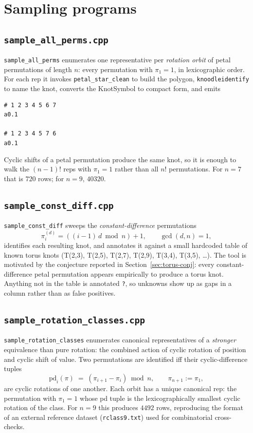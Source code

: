 \documentclass[11pt,oneside]{report}
\theoremstyle{definition}
\newcommand{\pd}{\mathrm{pd}}
\begin{document}
\section{Sampling programs}\label{sec:sampling}

\subsection{\texttt{sample\_all\_perms.cpp}}

\texttt{sample\_all\_perms} enumerates one representative per \emph{rotation
orbit} of petal permutations of length $n$: every permutation with
$\pi_1 = 1$, in lexicographic order. For each rep it invokes
\texttt{petal\_star\_clean} to build the polygon, \texttt{knoodleidentify}
to name the knot, converts the KnotSymbol to compact form, and emits

\begin{lstlisting}[style=shell]
# 1 2 3 4 5 6 7
a0.1

# 1 2 3 4 5 7 6
a0.1
\end{lstlisting}

Cyclic shifts of a petal permutation produce the same knot, so it is
enough to walk the $(n-1)!$ reps with $\pi_1 = 1$ rather than all $n!$
permutations. For $n = 7$ that is $720$ rows; for $n = 9$, $40320$.

\subsection{\texttt{sample\_const\_diff.cpp}}\label{sec:sampleconstdiff}

\texttt{sample\_const\_diff} sweeps the \emph{constant-difference}
permutations
\[
\pi^{(d)}_i = ((i-1)\, d \bmod n) + 1, \qquad \gcd(d, n) = 1,
\]
identifies each resulting knot, and annotates it against a small hardcoded
table of known torus knots (T(2,3), T(2,5), T(2,7), T(2,9), T(3,4),
T(3,5), \ldots). The tool is motivated by the conjecture reported in
Section~\ref{sec:torus-conj}: every constant-difference petal permutation
appears empirically to produce a torus knot. Anything not in the table is
annotated \texttt{?}, so unknowns show up as gaps in a column rather than
as false positives.

\subsection{\texttt{sample\_rotation\_classes.cpp}}\label{sec:samplerotclasses}

\texttt{sample\_rotation\_classes} enumerates canonical representatives of
a \emph{stronger} equivalence than pure rotation: the combined action of
cyclic rotation of position and cyclic shift of value. Two permutations
are identified iff their cyclic-difference tuples
\[
\pd_i(\pi) \;=\; (\pi_{i+1} - \pi_i) \bmod n, \qquad
\pi_{n+1} := \pi_1,
\]
are cyclic rotations of one another. Each orbit has a unique canonical
rep: the permutation with $\pi_1 = 1$ whose $\pd$ tuple is the
lexicographically smallest cyclic rotation of the class. For $n = 9$
this produces $4492$ rows, reproducing the format of an external
reference dataset (\texttt{rclass9.txt}) used for combinatorial
cross-checks.
\end{document}
